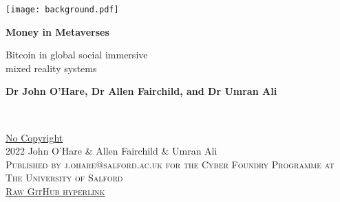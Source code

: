 \documentclass[
	12pt, %
	fleqn, %
	a4paper, %
	oneside, %
]{LegrandOrangeBook}
\begin{document}

\titlepage %
	{\texttt{[image: background.pdf]}} %
	{ %
		\centering\sffamily %
		{\Huge\bfseries Money in Metaverses\par} %
		\vspace{16pt} %
		{\LARGE Bitcoin in global social immersive \\mixed reality systems\par} %
		\vspace{24pt} %
		{\large \textbf{Dr John O'Hare, Dr Allen Fairchild, and Dr Umran Ali}\par} %
	}


\thispagestyle{empty} %

~\vfill %

\noindent \href{https://creativecommons.org/publicdomain/zero/1.0/}{No Copyright}\\ 2022 John O'Hare \& Allen Fairchild \& Umran Ali\\ %

\noindent \textsc{Published by j.ohare@salford.ac.uk for the Cyber Foundry Programme at The University of Salford}\\ %

\noindent \textsc{\href{https://raw.githubusercontent.com/GMCyberFoundry/Metaverse/main/Paper/metaverseBTC.pdf}{Raw GitHub hyperlink}}\\ %
\end{document}
